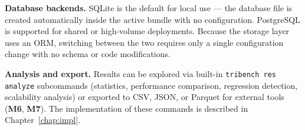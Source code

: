 \documentclass{l4proj}
\begin{document}
\textbf{Database backends.} SQLite is the default for local use — the database file is created automatically inside the active bundle with no configuration. PostgreSQL is supported for shared or high-volume deployments. Because the storage layer uses an ORM, switching between the two requires only a single configuration change with no schema or code modifications.

\textbf{Analysis and export.} Results can be explored via built-in \texttt{tribench res analyze} subcommands (statistics, performance comparison, regression detection, scalability analysis) or exported to CSV, JSON, or Parquet for external tools (\textbf{M6}, \textbf{M7}). The implementation of these commands is described in Chapter~\ref{chap:impl}.






\end{document}
